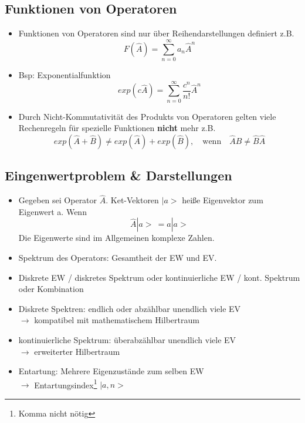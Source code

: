 \documentclass[10pt,article,colorback,accentcolor=tud9d]{scrartcl}
\begin{document}
\begin{fleqn}
\subsection{Funktionen von Operatoren}
\begin{itemize}
  \item Funktionen von Operatoren sind nur über Reihendarstellungen definiert z.B.
    \begin{equation}
    F(\hat{A})=\sum^\infty_{n=0}a_n\hat{A}^n
    \end{equation}
  \item Bsp: Exponentialfunktion
    \begin{equation}
    exp(c\hat{A})= \sum^\infty_{n=0}\frac{c^n}{n!}\hat{A}^n
    \end{equation}
  \item Durch Nicht-Kommutativität des Produkts von Operatoren gelten viele Rechenregeln für spezielle Funktionen \textbf{nicht} mehr z.B.
  \begin{equation}
  exp(\hat{A}+\hat{B})\neq exp(\hat{A}) +exp(\hat{B}), \quad \text{wenn} \quad \hat{A}\hat{B} \neq \hat{B}\hat{A}
  \end{equation}
\end{itemize}
\subsection{Eingenwertproblem \& Darstellungen}
\begin{itemize}
  \item Gegeben sei Operator $\hat{A}$. Ket-Vektoren $\left.\right|a>$ heiße Eigenvektor zum Eigenwert a. Wenn
    \begin{equation}
    \hat{A}\left.\right|a> \ = a\left.\right|a>
    \end{equation}
    Die Eigenwerte sind im Allgemeinen komplexe Zahlen.
  \item Spektrum des Operators: Gesamtheit der EW und EV.
  \item Diskrete EW / diskretes Spektrum oder kontinuierliche EW / kont. Spektrum oder Kombination
  \item Diskrete Spektren: endlich oder abzählbar unendlich viele EV\\
    $\rightarrow$ kompatibel mit mathematischem Hilbertraum
  \item kontinuierliche Spektrum: überabzählbar unendlich viele EV\\
    $\rightarrow$ erweiterter Hilbertraum
  \item Entartung: Mehrere Eigenzustände zum selben EW\\
    $\rightarrow$ Entartungsindex\footnote{Komma nicht nötig} $\left.\right|a,n>$
\end{itemize}

\end{fleqn}
\end{document}
